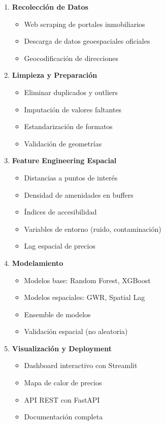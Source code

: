 \documentclass[11pt,a4paper]{article}
\begin{document}
\begin{enumerate}
    \item \textbf{Recolección de Datos}
    \begin{itemize}
        \item Web scraping de portales inmobiliarios
        \item Descarga de datos geoespaciales oficiales
        \item Geocodificación de direcciones
    \end{itemize}
    
    \item \textbf{Limpieza y Preparación}
    \begin{itemize}
        \item Eliminar duplicados y outliers
        \item Imputación de valores faltantes
        \item Estandarización de formatos
        \item Validación de geometrías
    \end{itemize}
    
    \item \textbf{Feature Engineering Espacial}
    \begin{itemize}
        \item Distancias a puntos de interés
        \item Densidad de amenidades en buffers
        \item Índices de accesibilidad
        \item Variables de entorno (ruido, contaminación)
        \item Lag espacial de precios
    \end{itemize}
    
    \item \textbf{Modelamiento}
    \begin{itemize}
        \item Modelos base: Random Forest, XGBoost
        \item Modelos espaciales: GWR, Spatial Lag
        \item Ensemble de modelos
        \item Validación espacial (no aleatoria)
    \end{itemize}
    
    \item \textbf{Visualización y Deployment}
    \begin{itemize}
        \item Dashboard interactivo con Streamlit
        \item Mapa de calor de precios
        \item API REST con FastAPI
        \item Documentación completa
    \end{itemize}
\end{enumerate}
\end{document}
